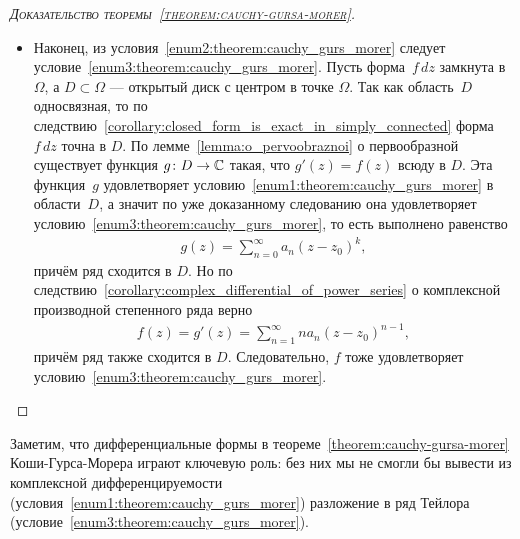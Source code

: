 \documentclass[../complex-analysis.tex]{subfiles}
\begin{document}
\begin{proof}[\normalfont\textsc{Доказательство теоремы~\ref{theorem:cauchy-gursa-morer}}]
\begin{itemize}
  \item Наконец, из условия~\ref{enum2:theorem:cauchy_gurs_morer} следует условие~\ref{enum3:theorem:cauchy_gurs_morer}. Пусть форма~$ f\,dz $ замкнута в $ \Omega $, а $ D \subset \Omega $ --- открытый диск с центром в точке $ \Omega $. Так как область~$ D $ односвязная, то по следствию~\ref{corollary:closed_form_is_exact_in_simply_connected} форма~$ f\,dz $ точна в $ D $. По лемме~\ref{lemma:o_pervoobraznoi} о первообразной существует функция $ g\colon D\to\mathbb{C} $ такая, что $ g'(z) = f(z) $ всюду в $ D $. Эта функция~$ g $ удовлетворяет условию~\ref{enum1:theorem:cauchy_gurs_morer} в области~$ D $, а значит по уже доказанному следованию она удовлетворяет условию~\ref{enum3:theorem:cauchy_gurs_morer}, то есть выполнено равенство
   \begin{align*}
    g(z) = \sum_{n=0}^{\infty} a_n(z-z_0)^{k},
   \end{align*} причём ряд сходится в $ D $. Но по следствию~\ref{corollary:complex_differential_of_power_series} о комплексной производной степенного ряда верно
   \begin{align*}
    f(z) = g'(z) = \sum_{n=1}^{\infty}na_n(z-z_0)^{n-1},
   \end{align*} причём ряд также сходится в $ D $. Следовательно, $ f $ тоже удовлетворяет условию~\ref{enum3:theorem:cauchy_gurs_morer}.
 \end{itemize}
\end{proof}

Заметим, что дифференциальные формы в теореме~\ref{theorem:cauchy-gursa-morer} Коши-Гурса-Морера играют ключевую роль: без них мы не смогли бы вывести из комплексной дифференцируемости (условия~\ref{enum1:theorem:cauchy_gurs_morer}) разложение в ряд Тейлора (условие~\ref{enum3:theorem:cauchy_gurs_morer}).
\end{document}
